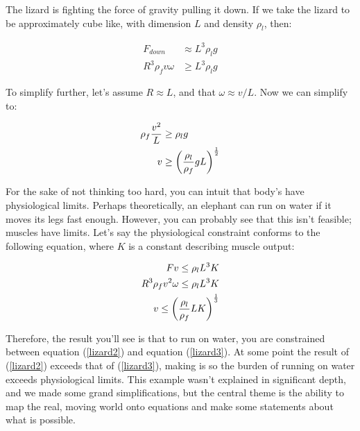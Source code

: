 The lizard is fighting the force of gravity pulling it down. If we take the lizard to be approximately cube like, with dimension $L$ and density $\rho_l$, then: 

\begin{equation} \label{lizard2}
\begin{split}
F_{down} &\approx L^3\rho_l g \\
R^3\rho_f v\omega &\geq L^3\rho_l g
\end{split}
\end{equation}

To simplify further, let's assume $R \approx L$, and that $\omega \approx v / L$. Now we can simplify to: 

\begin{equation} \label{lizard2}
\begin{split}
\rho_f \frac{v^2}{L} &\geq \rho_l g \\
v &\geq \left(\frac{\rho_l}{\rho_f} gL\right)^{\frac{1}{2}}
\end{split}
\end{equation}

For the sake of not thinking too hard, you can intuit that body's have physiological limits. Perhaps theoretically, an elephant can run on water if it moves its legs fast enough. However, you can probably see that this isn't feasible; muscles have limits. Let's say the physiological constraint conforms to the following equation, where $K$ is a constant describing muscle output: 

\begin{equation} \label{lizard3}
\begin{split}
F v \leq \rho_l L^3 K \\
R^3\rho_f v^2\omega \leq \rho_l L^3 K \\
v \leq \left(\frac{\rho_l}{\rho_f} L K\right)^{\frac{1}{3}} \\
\end{split}
\end{equation}

Therefore, the result you'll see is that to run on water, you are constrained between equation (\ref{lizard2}) and equation (\ref{lizard3}). At some point the result of (\ref{lizard2}) exceeds that of (\ref{lizard3}), making is so the burden of running on water exceeds physiological limits. This example wasn't explained in significant depth, and we made some grand simplifications, but the central theme is the ability to map the real, moving world onto equations and make some statements about what is possible. 



